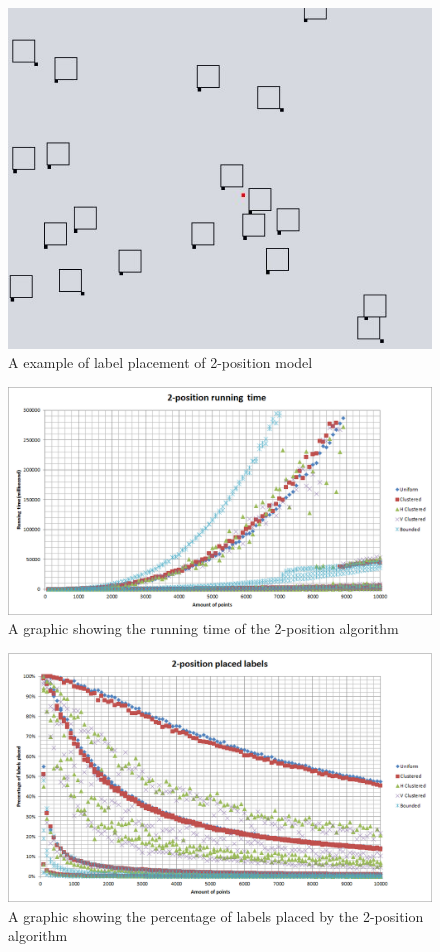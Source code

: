 \documentclass[crop=false,a4paper,oneside,11pt]{standalone}
\begin{document}
\begin{figure}[h!]
 \centering
  \centerline{\includegraphics[scale = 0.5]{2pos_example.JPG}}
  \caption{A example of label placement of 2-position model}
 \end{figure} 

\begin{figure}[h!]
 \centering
  \centerline{\includegraphics[scale = 0.6]{2PosRunningTime.png}}
  \caption{A graphic showing the running time of the 2-position algorithm}
 \end{figure}

\begin{figure}[h!]
 \centering
  \centerline{\includegraphics[scale = 0.6]{2PosLabelsPlaced.png}}
  \caption{A graphic showing the percentage of labels placed by the 2-position algorithm}
 \end{figure}
\end{document}
